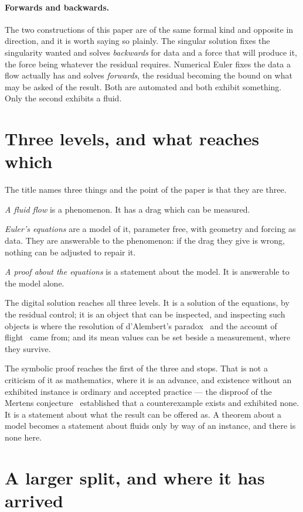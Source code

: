 \documentclass[11pt]{article}
\begin{document}
\paragraph{Forwards and backwards.} The two constructions of this paper are of the same formal kind
and opposite in direction, and it is worth saying so plainly. The singular solution fixes the
singularity wanted and solves \emph{backwards} for data and a force that will produce it, the force
being whatever the residual requires. Numerical Euler fixes the data a flow actually has and solves
\emph{forwards}, the residual becoming the bound on what may be asked of the result. Both are
automated and both exhibit something. Only the second exhibits a fluid.

\section{Three levels, and what reaches which}\label{sec:levels}

The title names three things and the point of the paper is that they are three.

\emph{A fluid flow} is a phenomenon. It has a drag which can be measured.

\emph{Euler's equations} are a model of it, parameter free, with geometry and forcing as data. They
are answerable to the phenomenon: if the drag they give is wrong, nothing can be adjusted to repair
it.

\emph{A proof about the equations} is a statement about the model. It is answerable to the model
alone.

The digital solution reaches all three levels. It is a solution of the equations, by the residual
control; it is an object that can be inspected, and inspecting such objects is where the resolution
of d'Alembert's paradox~\cite{dalembert} and the account of flight~\cite{flight} came from; and its
mean values can be set beside a measurement, where they survive.

The symbolic proof reaches the first of the three and stops. That is not a criticism of it as
mathematics, where it is an advance, and existence without an exhibited instance is ordinary and
accepted practice --- the disproof of the Mertens conjecture~\cite{mertens} established that a
counterexample exists and exhibited none. It is a statement about what the result can be offered as.
A theorem about a model becomes a statement about fluids only by way of an instance, and there is
none here.

\section{A larger split, and where it has arrived}\label{sec:split}
\end{document}
